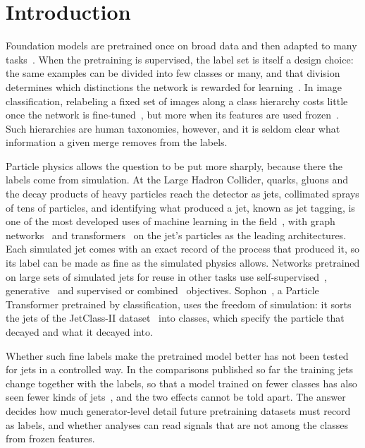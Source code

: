 \section{Introduction}\label{sec:intro}

Foundation models are pretrained once on broad data and then adapted to many tasks~\cite{bommasani}.
When the pretraining is supervised, the label set is itself a design choice: the same examples can be divided into
few classes or many, and that division determines which distinctions the network is rewarded for
learning~\cite{mahajan}.
In image classification, relabeling a fixed set of images along a class hierarchy costs little once the network is
fine-tuned~\cite{huh}, but more when its features are used frozen~\cite{hong}.
Such hierarchies are human taxonomies, however, and it is seldom clear what information a given merge removes from
the labels.

Particle physics allows the question to be put more sharply, because there the labels come from simulation.
At the Large Hadron Collider, quarks, gluons and the decay products of heavy particles reach the detector as jets,
collimated sprays of tens of particles, and identifying what produced a jet, known as jet tagging, is one of the most
developed uses of machine learning in the field~\cite{larkoski,feickert}, with graph networks~\cite{particlenet} and
transformers~\cite{part} on the jet's particles as the leading architectures.
Each simulated jet comes with an exact record of the process that produced it, so its label can be made as fine as
the simulated physics allows.
Networks pretrained on large sets of simulated jets for reuse in other tasks use self-supervised~\cite{jetclr,rs3l,mpm,hepjepa},
generative~\cite{omnijet} and supervised or combined~\cite{part,omnilearn,omnilearned} objectives.
Sophon~\cite{sophon}, a Particle Transformer pretrained by classification, uses the freedom of simulation: it sorts
the jets of the JetClass-II dataset~\cite{jetclasstwo} into \Kfull{} classes, which specify the particle that decayed
and what it decayed into.

Whether such fine labels make the pretrained model better has not been tested for jets in a controlled way.
In the comparisons published so far the training jets change together with the labels, so that a model trained on
fewer classes has also seen fewer kinds of jets~\cite{sophon,glopartdp,datacomp,superjepa}, and the two effects cannot
be told apart.
The answer decides how much generator-level detail future pretraining datasets must record as labels, and whether
analyses can read signals that are not among the classes from frozen features.

